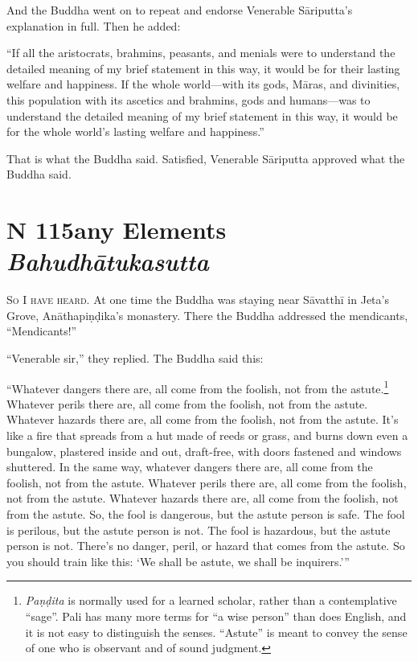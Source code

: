 \documentclass[12pt,openany]{book}%
\newcommand*{\suttatitleacronym}[1]{\smaller[2]{#1}\vspace*{.3em}}
\newcommand*{\suttatitletranslation}[1]{\linebreak{#1}}
\newcommand*{\suttatitleroot}[1]{\linebreak\smaller[2]\itshape{#1}}
\newcommand*{\tocacronym}[1]{\hspace*{-3.3em}{#1}\quad}
\newcommand*{\toctranslation}[1]{#1}
\newcommand*{\tocroot}[1]{(\textit{#1})}
\newcommand*{\scevam}[1]{\textsc{#1}}
\begin{document}
And the Buddha went on to repeat and endorse Venerable \textsanskrit{Sāriputta}’s explanation in full. Then he added: 

“If all the aristocrats, brahmins, peasants, and menials were to understand the detailed meaning of my brief statement in this way, it would be for their lasting welfare and happiness. If the whole world—with its gods, \textsanskrit{Māras}, and divinities, this population with its ascetics and brahmins, gods and humans—was to understand the detailed meaning of my brief statement in this way, it would be for the whole world’s lasting welfare and happiness.” 

That is what the Buddha said. Satisfied, Venerable \textsanskrit{Sāriputta} approved what the Buddha said. 

%
\section*{{\suttatitleacronym MN 115}{\suttatitletranslation Many Elements }{\suttatitleroot Bahudhātukasutta}}
\addcontentsline{toc}{section}{\tocacronym{MN 115} \toctranslation{Many Elements } \tocroot{Bahudhātukasutta}}

\scevam{So I have heard. }At one time the Buddha was staying near \textsanskrit{Sāvatthī} in Jeta’s Grove, \textsanskrit{Anāthapiṇḍika}’s monastery. There the Buddha addressed the mendicants, “Mendicants!” 

“Venerable sir,” they replied. The Buddha said this: 

“Whatever dangers there are, all come from the foolish, not from the astute.\footnote{\textit{\textsanskrit{Paṇḍita}} is normally used for a learned scholar, rather than a contemplative “sage”. Pali has many more terms for “a wise person” than does English, and it is not easy to distinguish the senses. “Astute” is meant to convey the sense of one who is observant and of sound judgment. } Whatever perils there are, all come from the foolish, not from the astute. Whatever hazards there are, all come from the foolish, not from the astute. It’s like a fire that spreads from a hut made of reeds or grass, and burns down even a bungalow, plastered inside and out, draft-free, with doors fastened and windows shuttered. In the same way, whatever dangers there are, all come from the foolish, not from the astute. Whatever perils there are, all come from the foolish, not from the astute. Whatever hazards there are, all come from the foolish, not from the astute. So, the fool is dangerous, but the astute person is safe. The fool is perilous, but the astute person is not. The fool is hazardous, but the astute person is not. There’s no danger, peril, or hazard that comes from the astute. So you should train like this: ‘We shall be astute, we shall be inquirers.’” 
\end{document}
